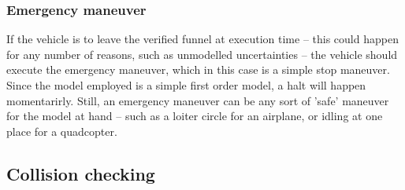 \subsubsection{Emergency maneuver}

If the vehicle is to leave the verified funnel at execution time -- this could
happen for any number of reasons, such as unmodelled uncertainties -- the
vehicle should execute the emergency maneuver, which in this case is a simple
stop maneuver. Since the model employed is a simple first order model, a halt
will happen momentarirly. Still, an emergency maneuver can be any sort of 'safe'
maneuver for the model at hand -- such as a loiter circle for an airplane, or
idling at one place for a quadcopter.

\subsection{Collision checking}
